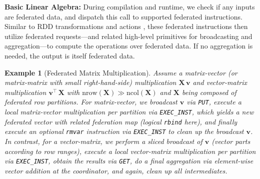 \documentclass[sigconf,screen]{acmart}
\newcommand{\mat}[1]{\ensuremath{\mathbf{#1}}}
\newtheorem{example}{Example}
\begin{document}
\textbf{Basic Linear Algebra:} During compilation and runtime, we check if any inputs are federated data, and dispatch this call to supported federated instructions. Similar to RDD transformations and actions \cite{ZahariaCDDMMFSS12}, these federated instructions then utilize federated requests---and related high-level primitives for broadcasting and aggregation---to compute the operations over federated data. If no aggregation is needed, the output is itself federated data. 

\begin{example}[Federated Matrix Multiplication]
Assume a matrix-vector (or matrix-matrix with small right-hand-side) multiplication $\mat{X}\,\mat{v}$ and vector-matrix multiplication $\mat{v}^{\top}\,\mat{X}$ with $\text{nrow}(\mat{X}) \gg \text{ncol}(\mat{X})$ and $\mat{X}$ being composed of federated row partitions. For matrix-vector, we broadcast $\mat{v}$ via \texttt{PUT}, execute a local matrix-vector multiplication per partition via \texttt{EXEC\_INST}, which yields a new federated vector with related federation map (logical \texttt{rbind} here), and finally execute an optional \texttt{rmvar} instruction via \texttt{EXEC\_INST} to clean up the broadcast $\mat{v}$. In contrast, for a vector-matrix, we perform a sliced broadcast of $\mat{v}$ (vector parts according to row ranges), execute a local vector-matrix multiplication per partition via \texttt{EXEC\_INST}, obtain the results via \texttt{GET}, do a final aggregation via element-wise vector addition at the coordinator, and again, clean up all intermediates. 
\end{example}
\end{document}
